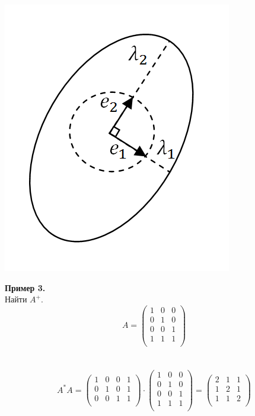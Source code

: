 \documentclass[12pt]{article}
\theoremstyle{definition}
\numberwithin{equation}{section}
\begin{document}
\begin{center} \includegraphics[scale=0.5]{l1_2}\end{center}
\textbf{Пример 3.}\\
Найти $A^+$.\\
\[A = \begin{pmatrix}
1 & 0 & 0 \\         
0 & 1 & 0 \\
0 & 0 & 1 \\
1 & 1 & 1 \\
\end{pmatrix}\]\\
\\
\[A^*A = \begin{pmatrix}
1 & 0 & 0 & 1 \\         
0 & 1 & 0 & 1\\
0 & 0 & 1 & 1\\
\end{pmatrix} \cdot \begin{pmatrix}
1 & 0 & 0 \\         
0 & 1 & 0 \\
0 & 0 & 1 \\
1 & 1 & 1 \\
\end{pmatrix} = \begin{pmatrix}
2 & 1 & 1 \\         
1 & 2 & 1 \\
1 & 1 & 2 \\
\end{pmatrix}\]\\
\end{document}
